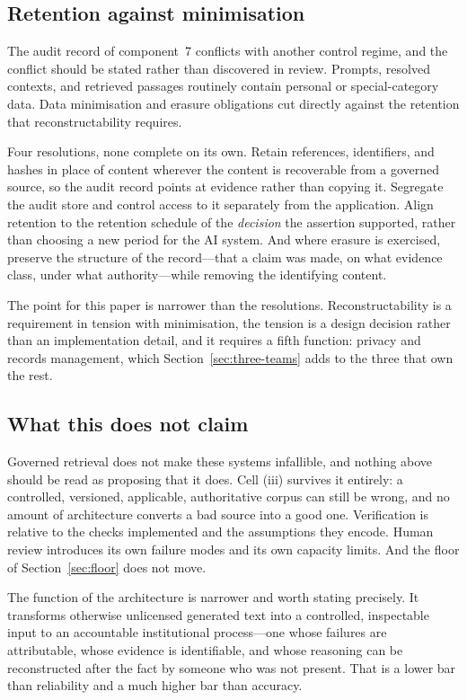 \documentclass[11pt]{article}
\theoremstyle{plain}
\theoremstyle{definition}
\begin{document}
\subsection{Retention against minimisation}
\label{sec:retention}

The audit record of component~7 conflicts with another control regime, and the
conflict should be stated rather than discovered in review. Prompts, resolved contexts,
and retrieved passages routinely contain personal or special-category data. Data
minimisation and erasure obligations cut directly against the retention that
reconstructability requires.

Four resolutions, none complete on its own. Retain references, identifiers, and hashes
in place of content wherever the content is recoverable from a governed source, so the
audit record points at evidence rather than copying it. Segregate the audit store and
control access to it separately from the application. Align retention to the retention
schedule of the \emph{decision} the assertion supported, rather than choosing a new
period for the AI system. And where erasure is exercised, preserve the structure of the
record---that a claim was made, on what evidence class, under what authority---while
removing the identifying content.

The point for this paper is narrower than the resolutions. Reconstructability is a
requirement in tension with minimisation, the tension is a design decision rather than
an implementation detail, and it requires a fifth function: privacy and records
management, which Section~\ref{sec:three-teams} adds to the three that own the rest.

\subsection{What this does not claim}

Governed retrieval does not make these systems infallible, and nothing above should
be read as proposing that it does. Cell (iii) survives it entirely: a controlled,
versioned, applicable, authoritative corpus can still be wrong, and no amount of
architecture converts a bad source into a good one. Verification is relative to the
checks implemented and the assumptions they encode. Human review introduces its own
failure modes and its own capacity limits. And the floor of
Section~\ref{sec:floor} does not move.

The function of the architecture is narrower and worth stating precisely. It
transforms otherwise unlicensed generated text into a controlled, inspectable input
to an accountable institutional process---one whose failures are attributable,
whose evidence is identifiable, and whose reasoning can be reconstructed after the
fact by someone who was not present. That is a lower bar than reliability and a
much higher bar than accuracy.
\end{document}
